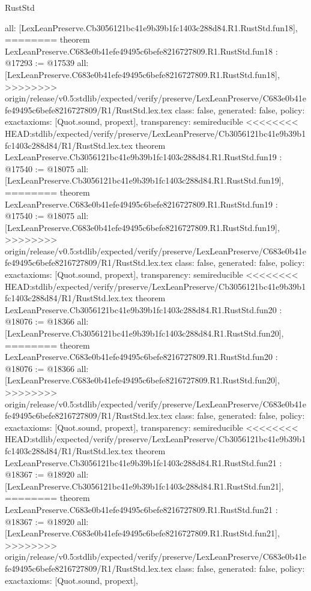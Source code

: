 \begin{lexlean}{RustStd}
\begin{coremodule}
{\begin{coremodule}
{{{{{{{{{{{{{{{{{{{{{  all: [LexLeanPreserve.Cb3056121bc41e9b39b1fc1403c288d84.R1.RustStd.fun18],
========
theorem LexLeanPreserve.C683e0b41efe49495c6befe8216727809.R1.RustStd.fun18 : @17293 := @17539 {
  all: [LexLeanPreserve.C683e0b41efe49495c6befe8216727809.R1.RustStd.fun18],
>>>>>>>> origin/release/v0.5:stdlib/expected/verify/preserve/LexLeanPreserve/C683e0b41efe49495c6befe8216727809/R1/RustStd.lex.tex
  class: false,
  generated: false,
  policy: exact{axioms: [Quot.sound, propext]},
  transparency: semireducible
}
<<<<<<<< HEAD:stdlib/expected/verify/preserve/LexLeanPreserve/Cb3056121bc41e9b39b1fc1403c288d84/R1/RustStd.lex.tex
theorem LexLeanPreserve.Cb3056121bc41e9b39b1fc1403c288d84.R1.RustStd.fun19 : @17540 := @18075 {
  all: [LexLeanPreserve.Cb3056121bc41e9b39b1fc1403c288d84.R1.RustStd.fun19],
========
theorem LexLeanPreserve.C683e0b41efe49495c6befe8216727809.R1.RustStd.fun19 : @17540 := @18075 {
  all: [LexLeanPreserve.C683e0b41efe49495c6befe8216727809.R1.RustStd.fun19],
>>>>>>>> origin/release/v0.5:stdlib/expected/verify/preserve/LexLeanPreserve/C683e0b41efe49495c6befe8216727809/R1/RustStd.lex.tex
  class: false,
  generated: false,
  policy: exact{axioms: [Quot.sound, propext]},
  transparency: semireducible
}
<<<<<<<< HEAD:stdlib/expected/verify/preserve/LexLeanPreserve/Cb3056121bc41e9b39b1fc1403c288d84/R1/RustStd.lex.tex
theorem LexLeanPreserve.Cb3056121bc41e9b39b1fc1403c288d84.R1.RustStd.fun20 : @18076 := @18366 {
  all: [LexLeanPreserve.Cb3056121bc41e9b39b1fc1403c288d84.R1.RustStd.fun20],
========
theorem LexLeanPreserve.C683e0b41efe49495c6befe8216727809.R1.RustStd.fun20 : @18076 := @18366 {
  all: [LexLeanPreserve.C683e0b41efe49495c6befe8216727809.R1.RustStd.fun20],
>>>>>>>> origin/release/v0.5:stdlib/expected/verify/preserve/LexLeanPreserve/C683e0b41efe49495c6befe8216727809/R1/RustStd.lex.tex
  class: false,
  generated: false,
  policy: exact{axioms: [Quot.sound, propext]},
  transparency: semireducible
}
<<<<<<<< HEAD:stdlib/expected/verify/preserve/LexLeanPreserve/Cb3056121bc41e9b39b1fc1403c288d84/R1/RustStd.lex.tex
theorem LexLeanPreserve.Cb3056121bc41e9b39b1fc1403c288d84.R1.RustStd.fun21 : @18367 := @18920 {
  all: [LexLeanPreserve.Cb3056121bc41e9b39b1fc1403c288d84.R1.RustStd.fun21],
========
theorem LexLeanPreserve.C683e0b41efe49495c6befe8216727809.R1.RustStd.fun21 : @18367 := @18920 {
  all: [LexLeanPreserve.C683e0b41efe49495c6befe8216727809.R1.RustStd.fun21],
>>>>>>>> origin/release/v0.5:stdlib/expected/verify/preserve/LexLeanPreserve/C683e0b41efe49495c6befe8216727809/R1/RustStd.lex.tex
  class: false,
  generated: false,
  policy: exact{axioms: [Quot.sound, propext]},
}}}}}}}}}}}}}}}}}}}}}}}}}
\end{coremodule}}
\end{coremodule}
\end{lexlean}

